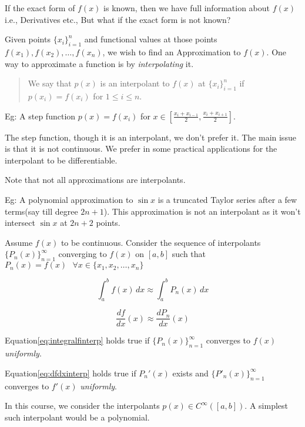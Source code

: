 \documentclass[
]{book}
\begin{document}
If the exact form of \(f(x)\) is known, then we have full information about \(f(x)\) i.e., Derivatives etc., But what if the exact form is not known?

Given points \(\{x_i\}_{i=1}^n\) and functional values at those points \(f(x_1),f(x_2), \dots, f(x_n)\), we wish to find an Approximation to \(f(x)\). One way to approximate a function is by \emph{interpolating} it.

\begin{quote}
We say that \(p(x)\) is an interpolant to \(f(x)\) at \(\{x_i\}_{i=1}^n\) if \(p(x_i)= f(x_i)\) for \(1\le i\le n\).
\end{quote}

Eg: A step function \(p(x) = f(x_i)\) for \(x\in \left[ \frac{x_i+x_{i-1}}{2}, \frac{x_i+x_{i+1}}{2} \right]\).

The step function, though it is an interpolant, we don't prefer it. The main issue is that it is not continuous. We prefer in some practical applications for the interpolant to be differentiable.

Note that not all approximations are interpolants.

Eg: A polynomial approximation to \(\sin x\) is a truncated Taylor series after a few terms(say till degree \(2n+1\)). This approximation is not an interpolant as it won't intersect \(\sin x\) at \(2n+2\) points.

Assume \(f(x)\) to be continuous. Consider the sequence of interpolants \(\{P_n(x)\}_{n=1}^{\infty}\) converging to \(f(x)\) on \([a,b]\) such that \(P_n(x)=f(x) \ \  \ \forall x\in \{x_1,x_2,\dots,x_n \}\)

\begin{equation}
\label{eq:integralfinterp}
\int_a^b f(x) \, dx \approx \int_a^b P_n(x) \, dx 
\end{equation}

\begin{equation}
\label{eq:dfdxinterp}
\frac{df}{dx}(x) \approx \frac{dP_n}{dx}(x)
\end{equation}

Equation\eqref{eq:integralfinterp} holds true if \(\{P_n(x)\}_{n=1}^{\infty}\) converges to \(f(x)\) \emph{uniformly}.

Equation\eqref{eq:dfdxinterp} holds true if \(P_n'(x)\) exists and \(\{P'_n(x)\}_{n=1}^{\infty}\) converges to \(f'(x)\) \emph{uniformly}.

In this course, we consider the interpolants \(p(x) \in C^{\infty}([a,b])\). A simplest such interpolant would be a polynomial.
\end{document}
